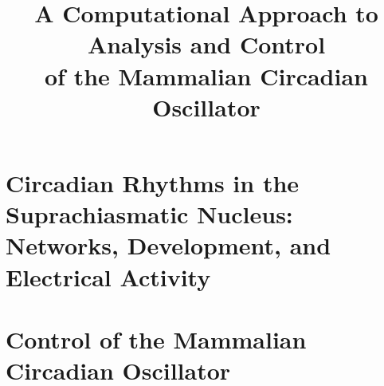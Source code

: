 \documentclass[11pt,letterpaper,oneside]{book}
\title{A Computational Approach to Analysis and Control\\of the Mammalian Circadian Oscillator}
\theoremstyle{asm}
\theoremstyle{plain}%
\theoremstyle{remark}
\begin{document}
\sloppy %
\doublespace
\frontmatter
\pagestyle{frontmatter}






{\singlespace
\tableofcontents
}



\mainmatter
\pagestyle{mainmatter}


\part{Circadian Rhythms in the Suprachiasmatic Nucleus: Networks, Development, and Electrical Activity}





\part{Control of the Mammalian Circadian Oscillator}





\backmatter
{\singlespace


%
%
}
\end{document}

